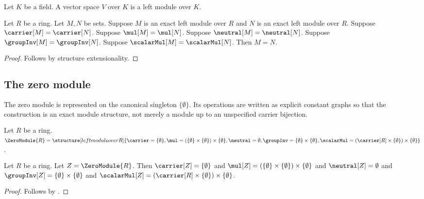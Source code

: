 \begin{struct}\label{vector_space}
    Let $K$ be a field.
    A vector space $V$ over $K$ is a left module over $K$.
\end{struct}

\begin{theorem}\label{exact_left_module_extensionality}
    Let $R$ be a ring.
    Let $M,N$ be sets.
    Suppose $M$ is an exact left module over $R$ and
        $N$ is an exact left module over $R$.
    Suppose $\carrier[M]=\carrier[N]$.
    Suppose $\mul[M]=\mul[N]$.
    Suppose $\neutral[M]=\neutral[N]$.
    Suppose $\groupInv[M]=\groupInv[N]$.
    Suppose $\scalarMul[M]=\scalarMul[N]$.
    Then $M=N$.
\end{theorem}
\begin{proof}
    Follows by structure extensionality.
\end{proof}

\subsection{The zero module}

The zero module is represented on the canonical singleton
$\{\emptyset\}$.  Its operations are written as explicit constant graphs so
that the construction is an exact module structure, not merely a module up
to an unspecified carrier bijection.

\begin{definition}\label{zero_module}
    Let $R$ be a ring.
    $\ZeroModule{R}=
        \structure[left module over R]{
            \carrier=\{\emptyset\},
            \mul=(\{\emptyset\}\times\{\emptyset\})
                \times\{\emptyset\},
            \neutral=\emptyset,
            \groupInv=\{\emptyset\}\times\{\emptyset\},
            \scalarMul=(\carrier[R]\times\{\emptyset\})
                \times\{\emptyset\}
        }$.
\end{definition}

\begin{proposition}\label{zero_module_fields}
    Let $R$ be a ring.
    Let $Z=\ZeroModule{R}$.
    Then
        $\carrier[Z]=\{\emptyset\}$ and
        $\mul[Z]=(\{\emptyset\}\times\{\emptyset\})
            \times\{\emptyset\}$ and
        $\neutral[Z]=\emptyset$ and
        $\groupInv[Z]=\{\emptyset\}\times\{\emptyset\}$ and
        $\scalarMul[Z]=(\carrier[R]\times\{\emptyset\})
            \times\{\emptyset\}$.
\end{proposition}
\begin{proof}
    Follows by
        .
\end{proof}

